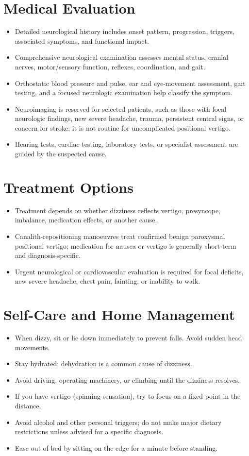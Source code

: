\section*{Medical Evaluation}
\begin{itemize}
  \item Detailed neurological history includes onset pattern, progression, triggers, associated symptoms, and functional impact.
  \item Comprehensive neurological examination assesses mental status, cranial nerves, motor/sensory function, reflexes, coordination, and gait.
  \item Orthostatic blood pressure and pulse, ear and eye-movement assessment, gait testing, and a focused neurologic examination help classify the symptom.
  \item Neuroimaging is reserved for selected patients, such as those with focal neurologic findings, new severe headache, trauma, persistent central signs, or concern for stroke; it is not routine for uncomplicated positional vertigo.
  \item Hearing tests, cardiac testing, laboratory tests, or specialist assessment are guided by the suspected cause.
\end{itemize}

\section*{Treatment Options}
\begin{itemize}
  \item Treatment depends on whether dizziness reflects vertigo, presyncope, imbalance, medication effects, or another cause.
  \item Canalith-repositioning manoeuvres treat confirmed benign paroxysmal positional vertigo; medication for nausea or vertigo is generally short-term and diagnosis-specific.
  \item Urgent neurological or cardiovascular evaluation is required for focal deficits, new severe headache, chest pain, fainting, or inability to walk.
\end{itemize}

\section*{Self-Care and Home Management}
\begin{itemize}
  \item When dizzy, sit or lie down immediately to prevent falls. Avoid sudden head movements.
  \item Stay hydrated; dehydration is a common cause of dizziness.
  \item Avoid driving, operating machinery, or climbing until the dizziness resolves.
  \item If you have vertigo (spinning sensation), try to focus on a fixed point in the distance.
  \item Avoid alcohol and other personal triggers; do not make major dietary restrictions unless advised for a specific diagnosis.
  \item Ease out of bed by sitting on the edge for a minute before standing.
\end{itemize}

